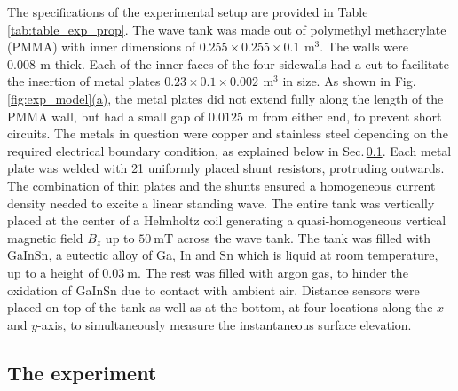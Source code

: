 \documentclass[aps,prfluids,reprint,superscriptaddress]{revtex4-2}
\newcommand{\subref}[2]{\ref{#1}\hyperref[#1]{(#2)}}
\begin{document}
The specifications of the experimental setup are provided in Table\,\ref{tab:table_exp_prop}. The wave tank was made out of polymethyl methacrylate (PMMA) with inner dimensions of $0.255 \times 0.255 \times 0.1\,\SI{}{\meter\tothe{3}}$. The walls were $0.008\,\SI{}{\meter}$ thick. Each of the inner faces of the four sidewalls had a cut to facilitate the insertion of metal plates $0.23 \times 0.1 \times 0.002\,\SI{}{\meter\tothe{3}}$ in size. As shown in Fig.\,\subref{fig:exp_model}{a}, the metal plates did not extend fully along the length of the PMMA wall, but had a small gap of $0.0125\,\SI{}{\meter}$ from either end, to prevent short circuits. The metals in question were copper and stainless steel depending on the required electrical boundary condition, as explained below in Sec.\,\ref{sec:exp_exp}. Each metal plate was welded with 21 uniformly placed shunt resistors, protruding outwards. The combination of thin plates and the shunts ensured a homogeneous current density needed to excite a linear standing wave. The entire tank was vertically placed at the center of a Helmholtz coil generating a quasi-homogeneous vertical magnetic field $B_z$ up to $\SI{50}{\milli\tesla}$ across the wave tank. The tank was filled with GaInSn, a eutectic alloy of Ga, In and Sn which is liquid at room temperature, up to a height of $\SI{0.03}{\meter}$. The rest was filled with argon gas, to hinder the oxidation of GaInSn due to contact with ambient air. Distance sensors were placed on top of the tank as well as at the bottom, at four locations along the $x$- and $y$-axis, to simultaneously measure the instantaneous surface elevation. 


\subsection{The experiment}
\label{sec:exp_exp}
\end{document}
